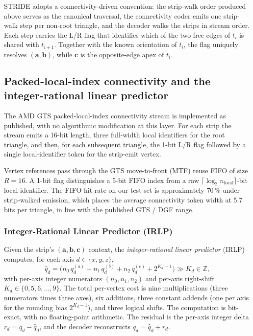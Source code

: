 \documentclass[pdflatex,sn-vancouver-num]{sn-jnl}%
\theoremstyle{thmstyleone}%
\theoremstyle{thmstyletwo}%
\theoremstyle{thmstylethree}%
\begin{document}
STRIDE adopts a connectivity-driven convention: the strip-walk order produced above serves as the canonical traversal, the connectivity coder emits one strip-walk step per non-root triangle, and the decoder walks the strips in stream order. Each step carries the L/R flag that identifies which of the two free edges of $t_i$ is shared with $t_{i+1}$. Together with the known orientation of $t_i$, the flag uniquely resolves $(\mathbf{a}, \mathbf{b})$, while $\mathbf{c}$ is the opposite-edge apex of $t_i$.

\subsection{Packed-local-index connectivity and the integer-rational linear predictor}\label{sec:irlp}

The AMD GTS packed-local-index connectivity stream is implemented as published, with no algorithmic modification at this layer. For each strip the stream emits a 16-bit length, three full-width local identifiers for the root triangle, and then, for each subsequent triangle, the 1-bit L/R flag followed by a single local-identifier token for the strip-emit vertex.

Vertex references pass through the GTS move-to-front (MTF) reuse FIFO of size $R = 16$. A 1-bit flag distinguishes a 5-bit FIFO index from a raw $\lceil\log_2 n_{\text{local}}\rceil$-bit local identifier. The FIFO hit rate on our test set is approximately 70\,\% under strip-walked emission, which places the average connectivity token width at 5.7 bits per triangle, in line with the published GTS / DGF range.

\subsubsection{Integer-Rational Linear Predictor (IRLP)}

Given the strip's $(\mathbf{a}, \mathbf{b}, \mathbf{c})$ context, the \emph{integer-rational linear predictor} (IRLP) computes, for each axis $d \in \{x, y, z\}$,
\begin{equation}
\hat{q}_d = \big(n_0\,q_d^{(a)} + n_1\,q_d^{(b)} + n_2\,q_d^{(c)} + 2^{K_d - 1}\big) \gg K_d \in \mathbb{Z},
\label{eq:irlp}
\end{equation}
with per-axis integer numerators $(n_0, n_1, n_2)$ and per-axis right-shift $K_d \in \{0, 5, 6, \ldots, 9\}$. The total per-vertex cost is nine multiplications (three numerators times three axes), six additions, three constant addends (one per axis for the rounding bias $2^{K_d-1}$), and three logical shifts. The computation is bit-exact, with no floating-point arithmetic. The residual is the per-axis integer delta $r_d = q_d - \hat{q}_d$, and the decoder reconstructs $q_d = \hat{q}_d + r_d$.
\end{document}
